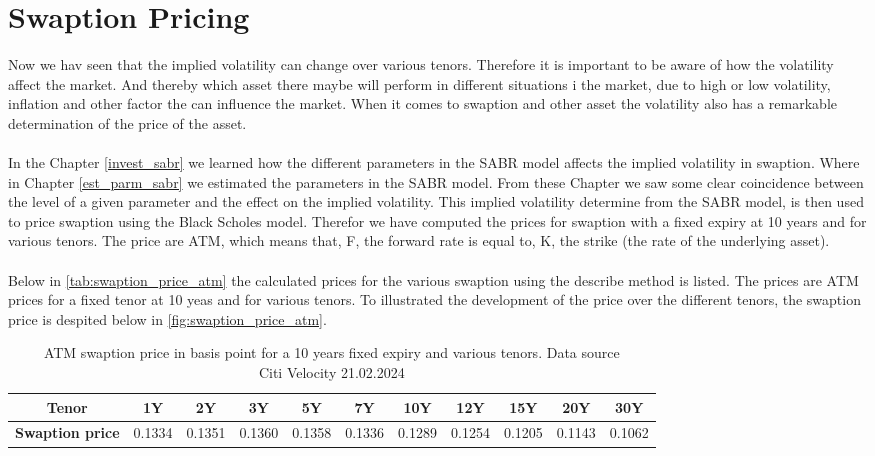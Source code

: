 \section{Swaption Pricing} \label{swaption_price_sec}
Now we hav seen that the implied volatility can change over various tenors. 
Therefore it is important to be aware of how the volatility affect the market.
And thereby which asset there maybe will perform in different situations i the market,
due to high or low volatility, inflation and other factor the can influence the market.
When it comes to swaption and other asset the volatility also has
a remarkable determination of the price of the asset. 
\\\\
In the Chapter \ref{invest_sabr} we learned how the different parameters in the 
SABR model affects the implied volatility in swaption. 
Where in Chapter \ref{est_parm_sabr} we estimated the parameters in the SABR model. 
From these Chapter we saw some clear coincidence between the level of a given parameter
and the effect on the implied volatility. 
This implied volatility determine from the SABR model, is then used to price swaption using the 
Black Scholes model. 
Therefor we have computed the prices for swaption with a fixed expiry at 10 years and for various tenors. 
The price are ATM, which means that, F, the forward rate is equal to, K, 
the strike (the rate of the underlying asset). 
\\\\
Below in \autoref{tab:swaption_price_atm} the calculated prices for the various swaption 
using the describe method is listed. 
The prices are ATM prices for a fixed tenor at 10 yeas and for various tenors. 
To illustrated the development of the price over the different tenors, 
the swaption price is despited below in  \autoref{fig:swaption_price_atm}.
\begin{table}[H]
  \centering
  \begin{tabular}{ccccccccccc}
    \toprule
    \textbf{ Tenor} & 1Y & 2Y & 3Y & 5Y & 7Y & 10Y & 12Y & 15Y & 20Y & 30Y \\
    \midrule
    \textbf{ Swaption price }&0.1334 & 0.1351 & 0.1360 &0.1358  &0.1336  &0.1289
    &0.1254& 0.1205 & 0.1143 & 0.1062 \\
    \bottomrule
  \end{tabular}
  \caption{ATM swaption price in basis point for a 10 years fixed expiry and various tenors.
  Data source  \\ Citi Velocity 21.02.2024}
  \label{tab:swaption_price_atm}
\end{table}
